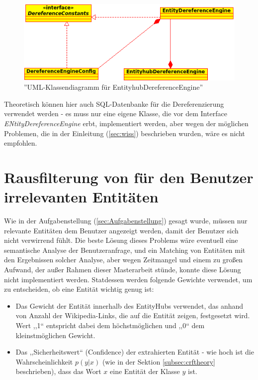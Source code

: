 \begin{figure}[ht]
\centering
\includegraphics[width=\textwidth]{Bilder/deref-uml.png}
\caption{''UML-Klassendiagramm für EntityhubDereferenceEngine''}
\label{fig:deref}
\end{figure}
Theoretisch können hier auch SQL-Datenbanke für die Dereferenzierung verwendet werden - es muss nur eine eigene Klasse, die vor dem Interface \textit{ENtityDereferenceEngine} erbt, implementiert werden, aber wegen der möglichen Problemen, die in der Einleitung (\ref{sec:wiss}) beschrieben wurden, wäre es nicht empfohlen.

\section{Rausfilterung von für den Benutzer irrelevanten Entitäten}
Wie in der Aufgabenstellung (\ref{sec:Aufgabenstellung}) gesagt wurde, müssen nur relevante Entitäten dem Benutzer angezeigt werden, damit der Benutzer sich nicht verwirrend fühlt. Die beste Lösung dieses Problems wäre eventuell eine semantische Analyse der Benutzeranfrage, und ein Matching von Entitäten mit den Ergebnissen solcher Analyse, aber wegen Zeitmangel und einem zu großen Aufwand, der außer Rahmen dieser Masterarbeit stünde, konnte diese Lösung nicht implementiert werden. Statdessen werden folgende Gewichte verwendet, um zu entscheiden, ob eine Entität wichtig genug ist:
\begin{itemize}
\item Das Gewicht der Entität innerhalb des EntityHubs verwendet, das anhand von Anzahl der Wikipedia-Links, die auf die Entität zeigen, festgesetzt wird. Wert ,,1`` entspricht dabei dem höchstmöglichen und ,,0`` dem kleinstmöglichen Gewicht.
\item Das ,,Sicherheitswert`` (Confidence) der extrahierten Entität - wie hoch ist die Wahrscheinlichkeit $p(y|x)$ (wie in der Sektion \ref{subsec:crftheory} beschrieben), dass das Wort $x$ eine Entität der Klasse $y$ ist.
\end{itemize}

